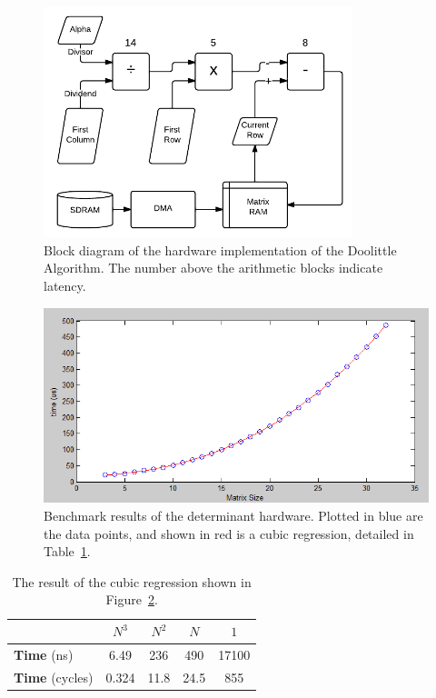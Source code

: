 \documentclass[]{article}
\begin{document}
\begin{figure}[htbp]
	\begin{center}
		\includegraphics[width = 0.8\textwidth]{DeterminantPipeline.pdf}
	\end{center}
	\caption{Block diagram of the hardware implementation of the Doolittle Algorithm. The number above the arithmetic blocks indicate latency.}
	\label{fig:det_block}
\end{figure}

\begin{figure}[htbp]
	\begin{center}
		\includegraphics[width = \textwidth]{detcubicresult.PNG}
	\end{center}
	\caption{Benchmark results of the determinant hardware. Plotted in blue are the data points, and shown in red is a cubic regression, detailed in Table~\ref{tab:polyfit_coeffs}.}
	\label{fig:det_bench_results}
\end{figure}

\begin{table}[htbp]
	\caption{The result of the cubic regression shown in Figure~\ref{fig:det_bench_results}.}
	\label{tab:polyfit_coeffs}
	\begin{center}
		\begin{tabular}{l|cccc}
		\hline

		\hline
			& \textbf{$N^3$} & \textbf{$N^2$} & \textbf{$N$} & \textbf{$1$}\\
		\hline
			\textbf{Time} (ns)
			& 6.49 	& 236	& 490	& 17100 \\
		\hline
			\textbf{Time} (cycles)
			& 0.324 & 11.8 	& 24.5 	& 855 \\

		\hline
		\end{tabular}
	\end{center}
\end{table}
\end{document}
